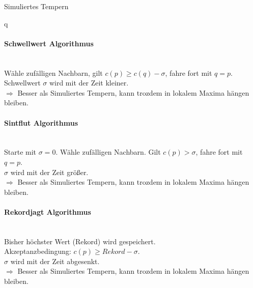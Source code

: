 \begin{algorithm}[H]
	\caption{Simuliertes Tempern}
        
        
        \Return q\\
\end{algorithm}


\paragraph{Schwellwert Algorithmus}
\text{ }\\Wähle zufälligen Nachbarn, gilt $c(p) \ge c(q) - \sigma$, fahre fort mit $q = p$.\\
Schwellwert $\sigma$ wird mit der Zeit kleiner.\\
$\Rightarrow$ Besser als Simuliertes Tempern, kann trozdem in lokalem Maxima hängen bleiben.\\


\paragraph{Sintflut Algorithmus}
\text{ }\\Starte mit $\sigma = 0$. Wähle zufälligen Nachbarn. Gilt $c(p) > \sigma$, fahre fort mit $q = p$.\\
$\sigma$ wird mit der Zeit größer.\\
$\Rightarrow$ Besser als Simuliertes Tempern, kann trozdem in lokalem Maxima hängen bleiben.\\

\paragraph{Rekordjagt Algorithmus}
\text{ }\\Bisher höchster Wert (Rekord) wird gespeichert.\\
Akzeptanzbedingung: $c(p) \ge Rekord - \sigma$.\\
$\sigma$ wird mit der Zeit abgesenkt.\\
$\Rightarrow$ Besser als Simuliertes Tempern, kann trozdem in lokalem Maxima hängen bleiben.\\

